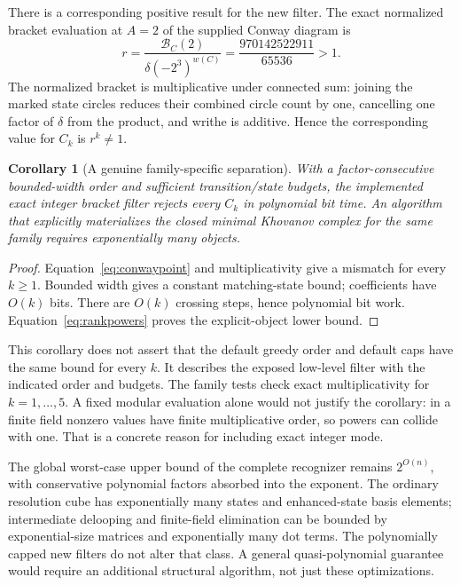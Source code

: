\documentclass[11pt]{article}
\newtheorem{corollary}[theorem]{Corollary}
\theoremstyle{remark}\newtheorem{remark}[theorem]{Remark}
\begin{document}
There is a corresponding positive result for the new filter. The exact
normalized bracket evaluation at $A=2$ of the supplied Conway diagram is
\begin{equation}
 r=\frac{\mathcal B_C(2)}{\delta(-2^3)^{w(C)}}
   =\frac{970142522911}{65536}>1.
 \label{eq:conwaypoint}
\end{equation}
The normalized bracket is multiplicative under connected sum: joining the
marked state circles reduces their combined circle count by one, cancelling
one factor of $\delta$ from the product, and writhe is additive. Hence the
corresponding value for $C_k$ is $r^k\ne1$.

\begin{corollary}[A genuine family-specific separation]
With a factor-consecutive bounded-width order and sufficient transition/state
budgets, the implemented exact integer bracket filter rejects every $C_k$ in
polynomial bit time. An algorithm that explicitly materializes the closed
minimal Khovanov complex for the same family requires exponentially many
objects.
\end{corollary}
\begin{proof}
Equation~\eqref{eq:conwaypoint} and multiplicativity give a mismatch for every
$k\ge1$. Bounded width gives a constant matching-state bound; coefficients
have $O(k)$ bits. There are $O(k)$ crossing steps, hence polynomial bit work.
Equation~\eqref{eq:rankpowers} proves the explicit-object lower bound.
\end{proof}

This corollary does not assert that the default greedy order and default caps
have the same bound for every $k$. It describes the exposed low-level filter
with the indicated order and budgets. The family tests check exact
multiplicativity for $k=1,\ldots,5$. A fixed modular evaluation alone would not
justify the corollary: in a finite field nonzero values have finite
multiplicative order, so powers can collide with one. That is a concrete reason
for including exact integer mode.

The global worst-case upper bound of the complete recognizer remains
$2^{O(n)}$, with conservative polynomial factors absorbed into the exponent.
The ordinary resolution cube has exponentially many states and enhanced-state
basis elements; intermediate delooping and finite-field elimination can be
bounded by exponential-size matrices and exponentially many dot terms.
The polynomially capped new filters do not alter that class. A general
quasi-polynomial guarantee would require an additional structural algorithm,
not just these optimizations.
\end{document}
